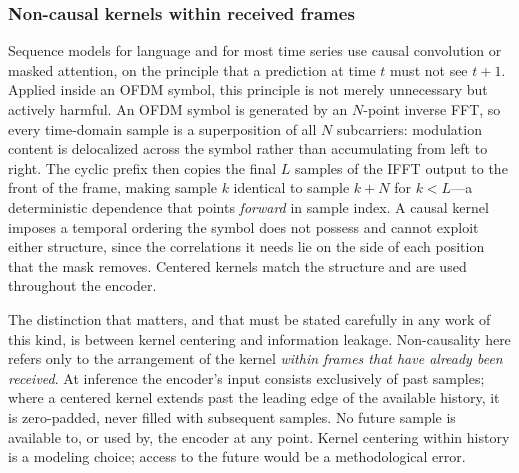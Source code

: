 \documentclass[lettersize,journal]{IEEEtran}
\begin{document}
\subsubsection{\textbf{Non-causal kernels within received frames}}
Sequence models for language and for most time series use causal convolution or
masked attention, on the principle that a prediction at time $t$ must not see
$t+1$. Applied inside an OFDM symbol, this principle is not merely unnecessary
but actively harmful. An OFDM symbol is generated by an $N$-point inverse FFT,
so every time-domain sample is a superposition of all $N$ subcarriers:
modulation content is delocalized across the symbol rather than accumulating
from left to right. The cyclic prefix then copies the final $L$ samples of the
IFFT output to the front of the frame, making sample $k$ identical to sample
$k+N$ for $k < L$---a deterministic dependence that points \emph{forward} in
sample index. A causal kernel imposes a temporal ordering the symbol does not
possess and cannot exploit either structure, since the correlations it needs lie
on the side of each position that the mask removes. Centered kernels match the
structure and are used throughout the encoder.

The distinction that matters, and that must be stated carefully in any work of
this kind, is between kernel centering and information leakage. Non-causality
here refers only to the arrangement of the kernel \emph{within frames that have
already been received}. At inference the encoder's input consists exclusively of
past samples; where a centered kernel extends past the leading edge of the
available history, it is zero-padded, never filled with subsequent samples. No
future sample is available to, or used by, the encoder at any point. Kernel
centering within history is a modeling choice; access to the future would be a
methodological error.
\end{document}
